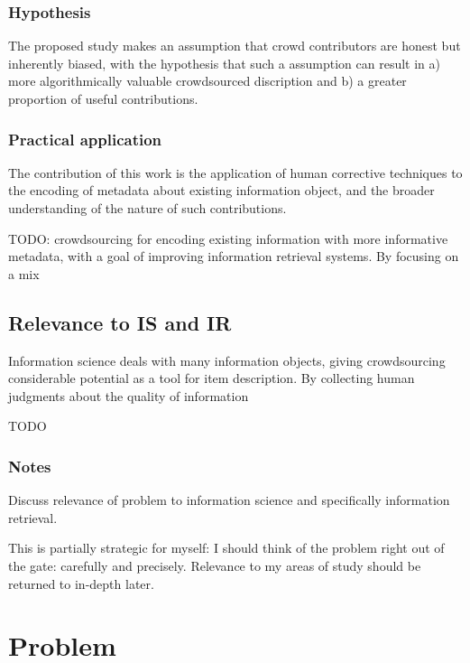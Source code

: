 \subsubsection{Hypothesis}\label{hypothesis}

The proposed study makes an assumption that crowd contributors are
honest but inherently biased, with the hypothesis that such a assumption
can result in a) more algorithmically valuable crowdsourced discription
and b) a greater proportion of useful contributions.

\subsubsection{Practical application}\label{practical-application}

The contribution of this work is the application of human corrective
techniques to the encoding of metadata about existing information
object, and the broader understanding of the nature of such
contributions.

TODO: crowdsourcing for encoding existing information with more
informative metadata, with a goal of improving information retrieval
systems. By focusing on a mix

\subsection{Relevance to IS and IR}\label{relevance-to-is-and-ir}

Information science deals with many information objects, giving
crowdsourcing considerable potential as a tool for item description. By
collecting human judgments about the quality of information

TODO

\subsubsection{Notes}\label{notes-1}

Discuss relevance of problem to information science and specifically
information retrieval.

This is partially strategic for myself: I should think of the problem
right out of the gate: carefully and precisely. Relevance to my areas of
study should be returned to in-depth later.

\section{Problem}\label{problem}

